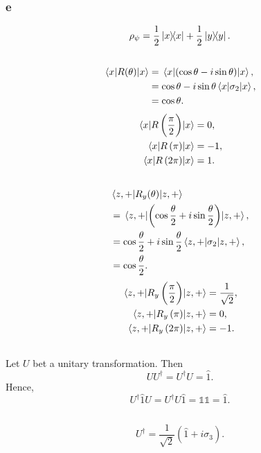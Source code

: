 \documentclass[a4paper,12pt,twoside]{article}
\begin{document}
\subsubsection*{e}
\begin{equation}
	\rho_\psi = \frac{1}{2} \op{x} + \frac{1}{2} \op{y}.
\end{equation}
\subsection{}%
\begin{align}
	\ev{R(\theta)}{x} &= \ev{(\cos\theta-i\sin\theta)}{x},\\
	&= \cos\theta - i\sin\theta\ev{\sigma_2}{x},\\
	&= \cos\theta.
\end{align}
\begin{align}
	\ev{R\left(\frac{\pi}{2}\right)}{x} &= 0,\\
	\ev{R\left(\pi\right)}{x} &= -1,\\
	\ev{R\left(2\pi\right)}{x} &= 1.
\end{align}
\subsection{}%
\begin{align}
	&\ev{R_y(\theta)}{z,+}\\ &= \ev{\left(\cos\frac{\theta}{2}+i\sin\frac{\theta}{2}\right)}{z,+},\\
	&= \cos\frac{\theta}{2} + i\sin\frac{\theta}{2}\ev{\sigma_2}{z,+},\\
	&= \cos\frac{\theta}{2}.
\end{align}
\begin{align}
	\ev{R_y\left(\frac{\pi}{2}\right)}{z,+} &= \frac{1}{\sqrt{2}},\\
	\ev{R_y\left(\pi\right)}{z,+} &= 0,\\
	\ev{R_y\left(2\pi\right)}{z,+} &= -1.
\end{align}
\subsection{}%
Let $U$ bet a unitary transformation.
Then
\[
	UU^\dagger = U^\dagger U = \hat{1}.
\]
Hence,
\[
	U^\dagger \hat{1} U = U^\dagger U \hat{1} = \mathbb{11} = \hat{1}.
\]
\subsection{}%
\begin{equation}
	U^\dagger = \frac{1}{\sqrt{2}} (\hat{1}+i\sigma_3).
\end{equation}
\end{document}
